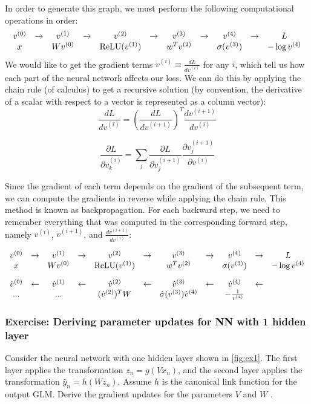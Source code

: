 \documentclass{article}
\begin{document}
\noindent
In order to generate this graph, we must perform the following computational operations in order:
\[
\begin{array}{*{11}c}
v^{(0)} & \rightarrow & v^{(1)} & \rightarrow & v^{(2)} & \rightarrow & v^{(3)} & \rightarrow & v^{(4)} & \rightarrow & L\\
x && Wv^{(0)} && \text{ReLU}(v^{(1)}) && w^Tv^{(2)} && \sigma(v^{(3)}) && -\log{v^{(4)}}\\
\end{array}
\]
We would like to get the gradient terms $\dot{v}^{(i)} \equiv \frac{d L}{d v^{(i)}}$ for any $i$, which tell us how each part of the neural network affects our loss. We can do this by applying the chain rule (of calculus) to get a recursive solution (by convention, the derivative of a scalar with respect to a vector is represented as a column vector):
\[
\frac{d L}{d v^{(i)}} = \left( \frac{d L}{d v^{(i+1)}}\right)^T \frac{d v^{(i+1)}}{d v^{(i)}}
\]

\[
\frac{\partial L}{\partial v_k^{(i)}} = \sum_j \frac{\partial L}{\partial v_j^{(i+1)}} \frac{\partial v_j^{(i+1)}}{\partial v^(i)}
\]

\noindent
Since the gradient of each term depends on the gradient of the subsequent term, we can compute the gradients in reverse while applying the chain rule. This method is known as backpropagation. For each backward step, we need to remember everything that was computed in the corresponding forward step, namely $v^{(i)}$, $\dot{v}^{(i+1)}$, and $\frac{d v^{(i+1)}}{d v^{(i)}}$:

\[
\begin{array}{*{11}c}
v^{(0)} & \rightarrow & v^{(1)} & \rightarrow & v^{(2)} & \rightarrow & v^{(3)} & \rightarrow & v^{(4)} & \rightarrow & L\\
\vspace{.35cm}
x && Wv^{(0)} && \text{ReLU}(v^{(1)}) && w^Tv^{(2)} && \sigma(v^{(3)}) && -\log{v^{(4)}}\\
\dot{v}^{(0)} & \leftarrow & \dot{v}^{(1)} & \leftarrow & \dot{v}^{(2)} & \leftarrow & \dot{v}^{(3)} & \leftarrow & \dot{v}^{(4)} & \leftarrow &\\
...&&...&& (\dot{v}^{(2)})^T W &&\dot{\sigma}(v^{(3)})\dot{v}^{(4)}&&-\frac{1}{v^{(4)}}&&
\end{array}
\]

\subsubsection{Exercise: Deriving parameter updates for NN with 1 hidden layer}
Consider the neural network with one hidden layer shown in \ref{fig:ex1}. The first layer applies the transformation ${z}_n = g({V}{x}_n)$, and the second layer applies the transformation $\hat{{y}}_n = h({W}{z}_n)$. Assume $h$ is the canonical link function for the output GLM. Derive the gradient updates for the parameters ${V}$ and ${W}$ .
\end{document}
